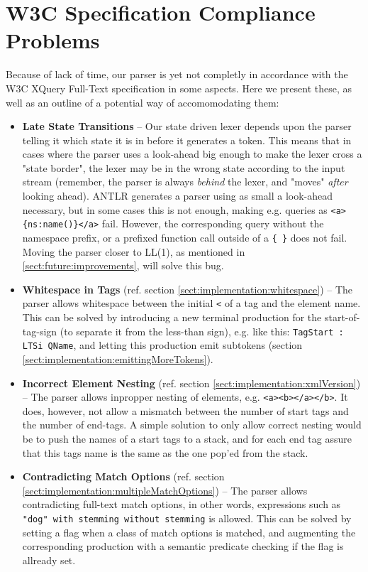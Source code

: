 \section{W3C Specification Compliance Problems}
\label{sect:future:knownBugs}
Because of lack of time, our parser is yet not completly in accordance with the
W3C XQuery Full-Text specification in some aspects. Here we present these, as
well as an outline of a potential way of accomomodating them: 

\begin{itemize}
\item \textbf{Late State Transitions} -- Our state driven lexer depends upon the parser telling it which state it is in before it generates a token. This means that in cases where the parser uses a look-ahead big enough to make the lexer cross a "state border", the lexer may be in the wrong state according to the input stream (remember, the parser is always \emph{behind} the lexer, and "moves" \emph{after} looking ahead). ANTLR generates a parser using as small a look-ahead necessary, but in some cases this is not enough, making e.g. queries as \verb!<a>{ns:name()}</a>! fail. However, the corresponding query without the namespace prefix, or a prefixed function call outside of a \verb!{ }! does not fail. Moving the parser closer to LL(1), as mentioned in \ref{sect:future:improvements}, will solve this bug.

\item \textbf{Whitespace in Tags} (ref. section \ref{sect:implementation:whitespace}) -- The parser allows whitespace between the initial \verb!<! of a tag and the element name. This can be solved by introducing a new terminal production for the start-of-tag-sign (to separate it from the less-than sign), e.g. like this: \verb!TagStart : LTSi QName!, and letting this production emit subtokens (section \ref{sect:implementation:emittingMoreTokens}).

\item \textbf{Incorrect Element Nesting} (ref. section \ref{sect:implementation:xmlVersion}) -- The parser allows inpropper nesting of elements, e.g. \verb!<a><b></a></b>!. It does, however, not allow a mismatch between the number of start tags and the number of end-tags. A simple solution to only allow correct nesting would be to push the names of a start tags to a stack, and for each end tag assure that this tags name is the same as the one pop'ed from the stack.

\item \textbf{Contradicting Match Options} (ref. section \ref{sect:implementation:multipleMatchOptions}) -- The parser allows contradicting full-text match options, in other words, expressions such as \verb!"dog" with stemming without stemming! is allowed. This can be solved by setting a flag when a class of match options is matched, and augmenting the corresponding production with a semantic predicate checking if the flag is allready set.

\end{itemize}

